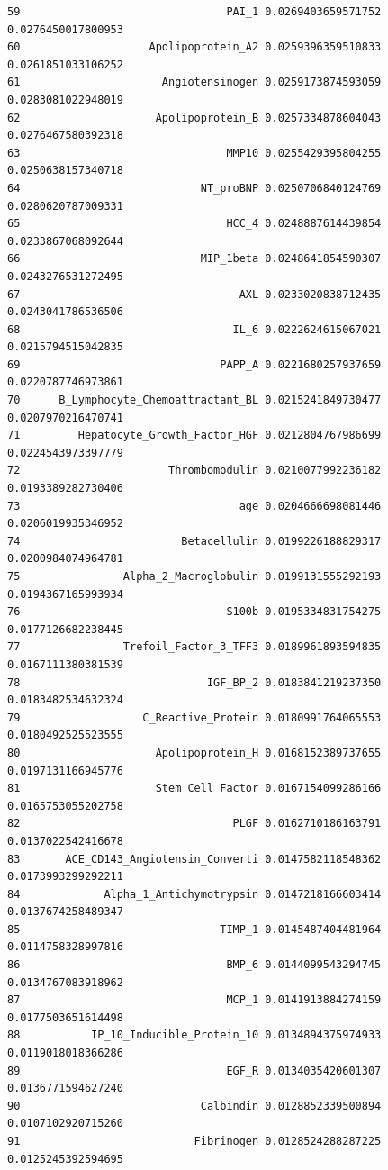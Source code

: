 \documentclass[
  letterpaper,
  DIV=11,
  numbers=noendperiod]{scrartcl}
\begin{document}
\begin{verbatim}
59                                PAI_1 0.0269403659571752  0.0276450017800953
60                    Apolipoprotein_A2 0.0259396359510833  0.0261851033106252
61                      Angiotensinogen 0.0259173874593059  0.0283081022948019
62                     Apolipoprotein_B 0.0257334878604043  0.0276467580392318
63                                MMP10 0.0255429395804255  0.0250638157340718
64                            NT_proBNP 0.0250706840124769  0.0280620787009331
65                                HCC_4 0.0248887614439854  0.0233867068092644
66                            MIP_1beta 0.0248641854590307  0.0243276531272495
67                                  AXL 0.0233020838712435  0.0243041786536506
68                                 IL_6 0.0222624615067021  0.0215794515042835
69                               PAPP_A 0.0221680257937659  0.0220787746973861
70      B_Lymphocyte_Chemoattractant_BL 0.0215241849730477  0.0207970216470741
71         Hepatocyte_Growth_Factor_HGF 0.0212804767986699  0.0224543973397779
72                       Thrombomodulin 0.0210077992236182  0.0193389282730406
73                                  age 0.0204666698081446  0.0206019935346952
74                         Betacellulin 0.0199226188829317  0.0200984074964781
75                Alpha_2_Macroglobulin 0.0199131555292193  0.0194367165993934
76                                S100b 0.0195334831754275  0.0177126682238445
77                Trefoil_Factor_3_TFF3 0.0189961893594835  0.0167111380381539
78                             IGF_BP_2 0.0183841219237350  0.0183482534632324
79                   C_Reactive_Protein 0.0180991764065553  0.0180492525523555
80                     Apolipoprotein_H 0.0168152389737655  0.0197131166945776
81                     Stem_Cell_Factor 0.0167154099286166  0.0165753055202758
82                                 PLGF 0.0162710186163791  0.0137022542416678
83       ACE_CD143_Angiotensin_Converti 0.0147582118548362  0.0173993299292211
84             Alpha_1_Antichymotrypsin 0.0147218166603414  0.0137674258489347
85                               TIMP_1 0.0145487404481964  0.0114758328997816
86                                BMP_6 0.0144099543294745  0.0134767083918962
87                                MCP_1 0.0141913884274159  0.0177503651614498
88           IP_10_Inducible_Protein_10 0.0134894375974933  0.0119018018366286
89                                EGF_R 0.0134035420601307  0.0136771594627240
90                            Calbindin 0.0128852339500894  0.0107102920715260
91                           Fibrinogen 0.0128524288287225  0.0125245392594695

\end{verbatim}
\end{document}
